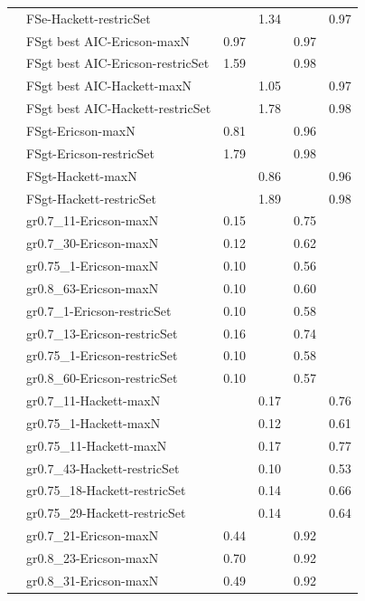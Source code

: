 \begin{footnotesize}
\begin{longtable}{@{}ll|rr|rr@{}}
 & FSe-Hackett-restricSet &      & 1.34 &      & 0.97\\
\addlinespace
\multirow{8}{*}{FSgt} & FSgt best AIC-Ericson-maxN & 0.97 &      & 0.97 &     \\
 & FSgt best AIC-Ericson-restricSet & 1.59 &      & 0.98 &     \\
 & FSgt best AIC-Hackett-maxN &      & 1.05 &      & 0.97\\
 & FSgt best AIC-Hackett-restricSet &      & 1.78 &      & 0.98\\
 & FSgt-Ericson-maxN & 0.81 &      & 0.96 &     \\
 & FSgt-Ericson-restricSet & 1.79 &      & 0.98 &     \\
 & FSgt-Hackett-maxN &      & 0.86 &      & 0.96\\
 & FSgt-Hackett-restricSet &      & 1.89 &      & 0.98\\
\addlinespace
\multirow{14}{*}{Iteroparity} & gr0.7\_11-Ericson-maxN & 0.15 &      & 0.75 &     \\
 & gr0.7\_30-Ericson-maxN & 0.12 &      & 0.62 &     \\
 & gr0.75\_1-Ericson-maxN & 0.10 &      & 0.56 &     \\
 & gr0.8\_63-Ericson-maxN & 0.10 &      & 0.60 &     \\
 & gr0.7\_1-Ericson-restricSet & 0.10 &      & 0.58 &     \\
 & gr0.7\_13-Ericson-restricSet & 0.16 &      & 0.74 &     \\
 & gr0.75\_1-Ericson-restricSet & 0.10 &      & 0.58 &     \\
 & gr0.8\_60-Ericson-restricSet & 0.10 &      & 0.57 &     \\
 & gr0.7\_11-Hackett-maxN &      & 0.17 &      & 0.76\\
 & gr0.75\_1-Hackett-maxN &      & 0.12 &      & 0.61\\
 & gr0.75\_11-Hackett-maxN &      & 0.17 &      & 0.77\\
 & gr0.7\_43-Hackett-restricSet &      & 0.10 &      & 0.53\\
 & gr0.75\_18-Hackett-restricSet &      & 0.14 &      & 0.66\\
 & gr0.75\_29-Hackett-restricSet &      & 0.14 &      & 0.64\\
\addlinespace
\pagebreak
\multirow{11}{*}{Offspring Q-Q} & gr0.7\_21-Ericson-maxN & 0.44 &      & 0.92 &     \\
 & gr0.8\_23-Ericson-maxN & 0.70 &      & 0.92 &     \\
 & gr0.8\_31-Ericson-maxN & 0.49 &      & 0.92 &     \\

\end{longtable}
\end{footnotesize}
